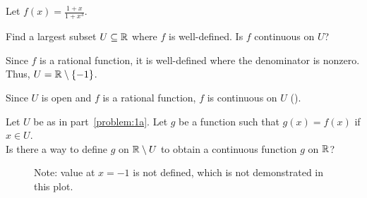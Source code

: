 \begin{problem}
  Let $\displaystyle f(x) = \frac{1 + x}{1 + x^3}$.
  \begin{enumroman}
    \item Find a largest subset $U \subseteq \mathbb{R}$ where $f$ is well-defined.
      Is $f$ continuous on $U$?~\label{problem:1a}
      
      \begin{answer}
        Since $f$ is a rational function, it is well-defined where
        the denominator is nonzero. \\
        Thus, $U = \mathbb{R} \setminus \{-1\}$.

        \step
        Since $U$ is open and $f$ is a rational function, $f$ is continuous
        on $U$ ().

      \end{answer}

    \newpage
    \item Let $U$ be as in part~\ref{problem:1a}.
      Let $g$ be a function such that $g(x) = f(x)$ if $x \in U$. \\
      Is there a way to define $g$ on $\mathbb{R} \setminus U$ to obtain
      a continuous function $g$ on $\mathbb{R}$?~\label{problem:1b}

      
      \begin{answer}
        \begin{figure}[H]
          \caption*{Note: value at $x = -1$ is not defined, which is not demonstrated in this plot.}
        \end{figure}


\end{answer}
\end{enumroman}
\end{problem}
